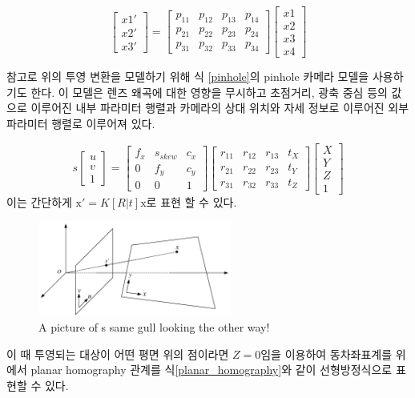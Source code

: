 \documentclass[master,korean,final]{cbnu-ecs}
\begin{document}
\begin{equation}
\begin{bmatrix} x1'\\x2'\\x3' \end{bmatrix} = \begin{bmatrix} p_{11} & p_{12} & p_{13} & p_{14} \\ p_{21} & p_{22} & p_{23} & p_{24}\\ p_{31} & p_{32} & p_{33} & p_{34} \end{bmatrix}\begin{bmatrix} x1\\x2\\x3\\x4 \end{bmatrix} \label{homography}
\end{equation}

참고로 위의 투영 변환을 모델하기 위해 식 \eqref{pinhole}의 pinhole 카메라 모델을 사용하기도 한다. 이 모델은 렌즈 왜곡에 대한 영향을 무시하고 초점거리, 광축 중심 등의 값으로 이루어진 내부 파라미터 행렬과 카메라의 상대 위치와 자세 정보로 이루어진 외부 파라미터 행렬로 이루어져 있다.

\begin{equation}
s\begin{bmatrix} u\\v\\1 \end{bmatrix} = \begin{bmatrix} f_{x} & s_{skew} & c_{x} \\ 0 & f_{y} & c_{y} \\ 0 & 0 & 1 \end{bmatrix}\begin{bmatrix} r_{11} & r_{12} & r_{13} & t_{X} \\ r_{21} & r_{22} & r_{23} & t_{Y}\\ r_{31} & r_{32} & r_{33} & t_{Z} \end{bmatrix}\begin{bmatrix} X\\Y\\Z\\1 \end{bmatrix} \label{pinhole}
\end{equation}
이는 간단하게 $\mathrm{x}'=K[R|t]\mathrm{x}$로 표현 할 수 있다.
\begin{figure}[!ht]
  \centering
	\includegraphics[width=240px]{img/planar_homography_cropped.pdf}
  \caption{A picture of s same gull looking the other way!}
\label{planar_homography}
\end{figure}
이 때 투영되는 대상이 어떤 평면 위의 점이라면 $Z=0$임을 이용하여 동차좌표계를 위에서 planar homography 관계를 식\eqref{planar_homography}와 같이 선형방정식으로 표현할 수 있다.
\end{document}
